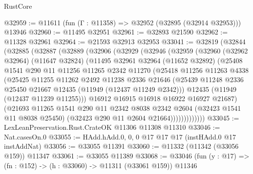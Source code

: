 \begin{lexlean}{RustCore}
\begin{coremodule}
@32959 := @11611 (fun (Γ : @11358) => @32952 (@32895 (@32914 @32953))) @13946
@32960 := @11495 @32951
@32961 := @32893 @21590
@32962 := @11328 @32961
@32964 := @21593 @32913 @32953
@33041 := @32819
    (@32844
      (@32885
        (@32887
          (@32889
            (@32906
              (@32929
                (@32946
                  (@32959
                    (@32960
                      (@32962 @32964)
                      (@11647 @32824)
                      (@11495
                        @32961
                        @32964
                        (@11652 @32892)
                        (@25408
                          @1541
                          @290
                          @11
                          @11256
                          @11265
                          @2342
                          @11270
                          (@25418
                            @11256
                            @11263
                            @4338
                            (@25425
                              @11255
                              @11262
                              @2492
                              @11238
                              @2336
                              @21646
                              (@25439
                                @11248
                                @2336
                                @25450
                                @21667
                                @12435
                                (@11949 (@12437 @11249 @2342)))
                              @12435
                              (@11949 (@12437 @11239 @11255)))
                            @16912
                            @16915
                            @16918
                            @16922
                            @16927
                            @21687)
                          (@21693
                            @11265
                            @1541
                            @290
                            @11
                            @2342
                            @8038
                            @2342
                            @2604
                            (@32423 @1541 @11 @8038 @25450)
                            (@32423 @290 @11 @2604 @21664)))))))))))))
@33045 := LexLeanPreservation.Rust.CrateOK @11306 @11308 @11310
@33046 := Nat.casesOn.{0}
@33055 := HAdd.hAdd.{0, 0, 0} @17 @17 @17 (instHAdd.{0} @17 instAddNat)
@33056 := @33055 @11391
@33060 := @11332 (@11342 (@33056 @159)) @11347
@33061 := @33055 @11389
@33068 := @33046 (fun (y : @17) => (fn : @152) -> (h : @33060) -> @11311 (@33061 @159)) @11346

\end{coremodule}
\end{lexlean}
